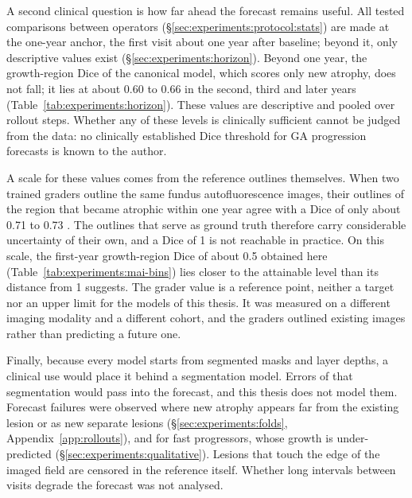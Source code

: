 A second clinical question is how far ahead the forecast remains useful.
All tested comparisons between operators
(\S\ref{sec:experiments:protocol:stats}) are made at the one-year anchor,
the first visit about one year after baseline; beyond it, only descriptive
values exist (\S\ref{sec:experiments:horizon}). Beyond one year, the
growth-region Dice of the canonical model, which scores only new atrophy,
does not fall; it
lies at about 0.60 to 0.66 in the second, third and later years
(Table~\ref{tab:experiments:horizon}). These values are
descriptive and pooled over rollout steps. Whether any of these levels is
clinically sufficient cannot be judged from the data: no clinically
established Dice threshold for GA progression forecasts is known to the
author.

A scale for these values comes from the reference outlines themselves.
When two trained graders outline the same fundus autofluorescence images,
their outlines of the region that became atrophic within one year agree
with a Dice of only about 0.71 to 0.73 \citep{Salvi2025}. The outlines
that serve as ground truth therefore carry considerable uncertainty of
their own, and a Dice of 1 is not reachable in practice. On this scale,
the first-year growth-region Dice of about 0.5 obtained here
(Table~\ref{tab:experiments:mai-bins}) lies closer to the attainable level
than its distance from 1 suggests. The grader value is a reference point,
neither a target nor an upper limit for the models of this thesis. It was
measured on a different imaging modality and a different cohort, and the
graders outlined existing images rather than predicting a future one.

Finally, because every model starts from segmented masks and layer
depths, a clinical use would place it behind a segmentation model. Errors of that
segmentation would pass into the forecast, and this thesis does not model
them. Forecast failures were observed where new atrophy appears far from
the existing lesion or as new separate lesions
(\S\ref{sec:experiments:folds}, Appendix~\ref{app:rollouts}), and for fast
progressors, whose growth is under-predicted
(\S\ref{sec:experiments:qualitative}). Lesions that touch the edge of the
imaged field are censored in the reference itself. Whether long intervals
between visits degrade the forecast was not analysed.

